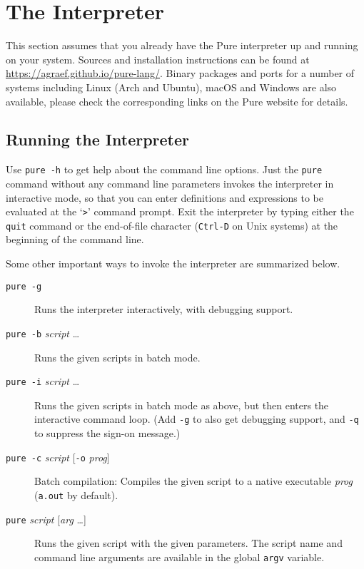 \documentclass[a4paper,12pt]{article}
\newcommand{\nt}[1]{\textrm{\textit{#1\/}}}
\begin{document}
\section{The Interpreter}
\label{Interpreter}

This section assumes that you already have the Pure interpreter up and running on your system. Sources and installation instructions can be found at \url{https://agraef.github.io/pure-lang/}. Binary packages and ports for a number of systems including Linux (Arch and Ubuntu), macOS and Windows are also available, please check the corresponding links on the Pure website for details.

\subsection{Running the Interpreter}

Use \verb|pure -h| to get help about the command line options. Just the \verb|pure| command without any command line parameters invokes the interpreter in interactive mode, so that you can enter definitions and expressions to be evaluated at the `\verb|>|' command prompt. Exit the interpreter by typing either the \verb|quit| command or the end-of-file character (\verb|Ctrl-D| on Unix systems) at the beginning of the command line.

Some other important ways to invoke the interpreter are summarized below.

\begin{description}
\item[\rm\texttt{pure -g}] Runs the interpreter interactively, with debugging support.
\item[\rm\texttt{pure -b} \nt{script} \ldots] Runs the given scripts in batch mode.
\item[\rm\texttt{pure -i} \nt{script} \ldots] Runs the given scripts in batch mode as above, but then enters the interactive command loop. (Add \texttt{-g} to also get debugging support, and \texttt{-q} to suppress the sign-on message.)
\item[\rm\texttt{pure -c} \nt{script} {[\texttt{-o} \nt{prog}]}] Batch compilation: Compiles the given script to a native executable \nt{prog} (\texttt{a.out} by default).
\item[\rm\texttt{pure} \nt{script} {[\nt{arg} \ldots]}] Runs the given script with the given parameters. The script name and command line arguments are available in the global \verb|argv| variable.
\end{description}
\end{document}
